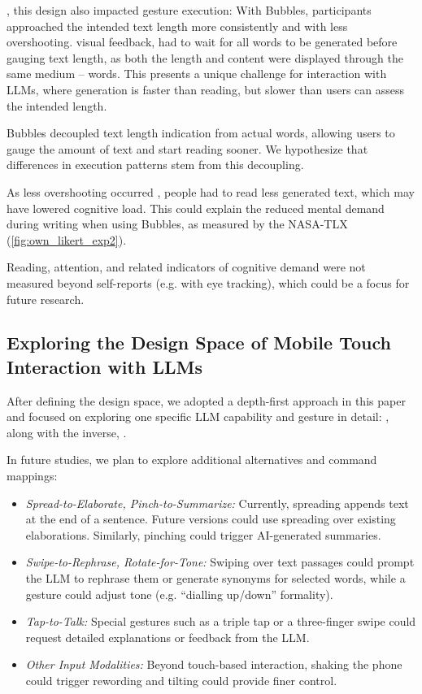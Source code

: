 , this design also impacted gesture execution: 
With Bubbles, participants approached the intended text length more consistently and with less overshooting. 
 visual feedback,  had to wait for all words to be generated before gauging text length, as both the length and content were displayed through the same medium -- words. 
This presents a unique challenge for interaction with LLMs, where generation is faster than reading, but slower than users can assess the intended length.

Bubbles decoupled text length indication from actual words, allowing users to gauge the amount of text and start reading sooner. We hypothesize that differences in execution patterns stem from this decoupling. 

As less overshooting occurred , people had to read less generated text, which may have lowered cognitive load. 
This could explain the reduced mental demand during writing when using Bubbles, as measured by the NASA-TLX (\cref{fig:own_likert_exp2}). 

Reading, attention, and related indicators of cognitive demand were not measured beyond self-reports (e.g. with eye tracking), which could be a focus for future research.




\subsection{Exploring the Design Space of Mobile Touch Interaction with LLMs}
After defining the design space, we adopted a depth-first approach in this paper and focused on exploring one specific LLM capability and gesture in detail: 
\spread{}, along with the inverse, \pinch{}. 

In future studies, we plan to explore additional alternatives and command mappings:
\begin{itemize}
    \itemsep 2mm
    \item \textit{Spread-to-Elaborate, Pinch-to-Summarize:} Currently, spreading appends text at the end of a sentence. Future versions could use spreading over existing  elaborations. Similarly, pinching could trigger AI-generated summaries.
    \item \textit{Swipe-to-Rephrase, Rotate-for-Tone:} Swiping over text passages could prompt the LLM to rephrase them or generate synonyms for selected words, while a  gesture could adjust tone (e.g. ``dialling up/down'' formality).
    \item \textit{Tap-to-Talk:} Special gestures such as a triple tap or a three-finger swipe could request detailed explanations or feedback from the LLM.
    \item \textit{Other Input Modalities:} Beyond touch-based interaction, shaking the phone could trigger rewording and tilting could provide finer control. %
\end{itemize}


